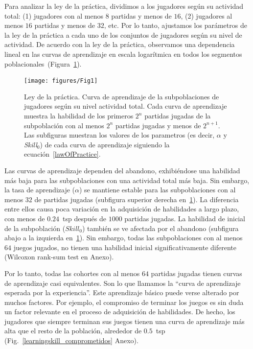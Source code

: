 \documentclass[a4paper,11pt]{book}
\theoremstyle{definition}
\begin{document}

Para analizar la ley de la pr\'actica, dividimos a los jugadores seg\'un su actividad total: (1) jugadores con al menos $8$ partidas y menos de $16$, (2) jugadores al menos $16$ partidas y menos de $32$, etc.
%
Por lo tanto, ajustamos los par\'ametros de la ley de la pr\'actica a cada uno de los conjuntos de jugadores seg\'un su nivel de actividad.
%
De acuerdo con la ley de la pr\'actica, observamos una dependencia lineal en las curvas de aprendizaje en escala logar\'itmica en todos los segmentos poblacionales~(Figura~\ref{learningskill_curve}).

\begin{figure}[ht!]
\centering
\texttt{[image: figures/Fig1]}
\caption{
Ley de la pr\'actica.
%
Curva de aprendizaje de la subpoblaciones de jugadores seg\'un su nivel actividad total.
%
Cada curva de aprendizaje muestra la habilidad de los primeros $2^n$ partidas jugadas de la subpoblaci\'on con al menos $2^n$ partidas jugadas y menos de $2^{n+1}$.
%
Las subfiguras muestran los valores de los parametros (es decir, $\alpha$ y \emph{Skill}$_0$) de cada curva de aprendizaje siguiendo la ecuaci\'on~\ref{lawOfPractice}.
}
\label{learningskill_curve}
\end{figure}

Las curvas de aprendizaje dependen del abandono, exhibi\'endose una habilidad m\'as baja para las subpoblaciones con una actividad total m\'as baja.
%
Sin embargo, la tasa de aprendizaje ($\alpha$) se mantiene estable para las subpoblaciones con al menos $32$ de partidas jugadas (subfigura superior derecha en~\ref{learningskill_curve}).
%
La diferencia entre ellos causa poca variaci\'on en la adquisici\'on de habilidades a largo plazo, con menos de $0.24$~tsp despu\'es de $1000$ partidas jugadas.
%
La habilidad de inicial de la subpoblaci\'on ($Skill_0$) tambi\'en se ve afectada por el abandono (subfigura abajo a la izquierda en~\ref{learningskill_curve}).
%
Sin embargo, todas las subpoblaciones con al menos $64$ juegos jugados, no tienen una habilidad inicial significativamente diferente (Wilcoxon rank-sum test en Anexo).


Por lo tanto, todas las cohortes con al menos $64$ partidas jugadas tienen curvas de aprendizaje casi equivalentes.
%
Son lo que llamamos la ``curva de aprendizaje esperada por la experiencia''.
%
Este aprendizaje b\'asico puede verse alterado por muchos factores.
%
Por ejemplo, el compromiso de terminar los juegos es sin duda un factor relevante en el proceso de adquisici\'on de habilidades.
%
De hecho, los jugadores que siempre terminan sus juegos tienen una curva de aprendizaje m\'as alta que el resto de la poblaci\'on, alrededor de $0.5$~tsp (Fig.~\ref{learningskill_comprometidos} Anexo).
\end{document}
